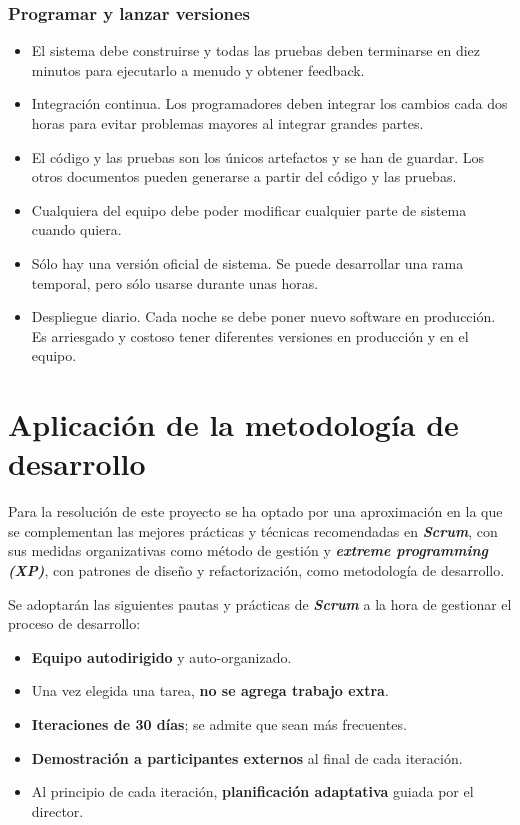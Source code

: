 \subsubsection{Programar y lanzar versiones}
\begin{itemize}
\item El sistema debe construirse y todas las pruebas deben terminarse en diez minutos para ejecutarlo a menudo y obtener feedback. 
\item Integración continua. Los programadores deben integrar los cambios cada dos horas para evitar problemas mayores al integrar grandes partes.
\item El código y las pruebas son los únicos artefactos y se han de guardar. Los otros documentos pueden generarse a partir del código y las pruebas.
\item Cualquiera del equipo debe poder modificar cualquier parte de sistema cuando quiera. 
\item Sólo hay una versión oficial de sistema. Se puede desarrollar una rama temporal, pero sólo usarse durante unas horas.
\item Despliegue diario. Cada noche se debe poner nuevo software en producción. Es arriesgado y costoso tener diferentes versiones en producción y en el equipo.
\end{itemize}


\section{Aplicación de la metodología de desarrollo}

Para la resolución de este proyecto se ha optado por una aproximación en la que se complementan las mejores prácticas y técnicas recomendadas en \textbf{\textit{Scrum}}, con sus medidas organizativas como método de gestión y \textbf{\textit{extreme programming (XP)}}, con patrones de diseño y refactorización, como metodología de desarrollo.

Se adoptarán las siguientes pautas y prácticas de \textbf{\textit{Scrum}} a la hora de gestionar el proceso de desarrollo:
\begin{itemize}
\item \textbf{Equipo autodirigido} y auto-organizado. 
\item Una vez elegida una tarea, \textbf{no se agrega trabajo extra}. %
\item \textbf{Iteraciones de 30 días}; se admite que sean más frecuentes.
\item \textbf{Demostración a participantes externos} al final de cada iteración. 
\item Al principio de cada iteración, \textbf{planificación adaptativa} guiada por el director.
\end{itemize}

